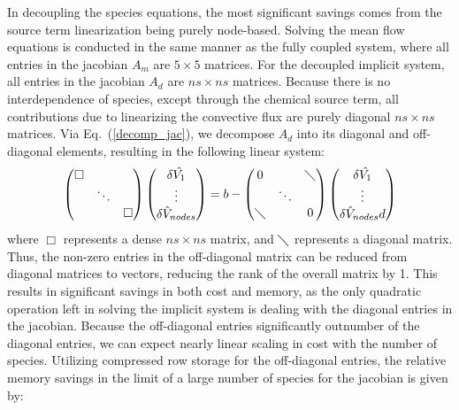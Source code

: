 \documentclass[]{aiaa-tc}%
\begin{document}
In decoupling the species equations, the most significant savings comes from the source term linearization being purely node-based\cite{gnoffo-tp}.  Solving the mean flow equations is conducted in the same manner as the fully coupled system, where all entries in the jacobian $A_m$ are $5\times5$ matrices.  For the decoupled implicit system, all entries in the jacobian $A_d$ are $ns \times ns$ matrices.  Because there is no interdependence of species, except through the chemical source term, all contributions due to linearizing the convective flux are purely diagonal $ns \times ns$ matrices.  Via Eq.~(\ref{decomp_jac}), we decompose $A_d$ into its diagonal and off-diagonal elements, resulting in the following linear system:
%
\begin{equation}
\label{dc_sys}
	\begin{pmatrix}
		\Box & & \\
		& \ddots & \\
		& & \Box
	\end{pmatrix}
	\begin{pmatrix}
		\delta \hat{V_1} \\
		\vdots \\
		\delta \hat{V}_{nodes}
	\end{pmatrix} = b -
	\begin{pmatrix}
		0 & & \diagdown \\
		& \ddots & \\
		\diagdown & & 0
	\end{pmatrix}
	\begin{pmatrix}
		\delta \hat{V_1} \\
		\vdots \\
		\delta \hat{V}_{nodes}d
	\end{pmatrix}
\end{equation}
%
where $\Box$ represents a dense $ns \times ns$ matrix, and $\diagdown$ represents a diagonal matrix.  Thus, the non-zero entries in the off-diagonal matrix can be reduced from diagonal matrices to vectors, reducing the rank of the overall matrix by 1.  This results in significant savings in both cost and memory, as the only quadratic operation left in solving the implicit system is dealing with the diagonal entries in the jacobian.  Because the off-diagonal entries significantly outnumber of the diagonal entries, we can expect nearly linear scaling in cost with the number of species.  Utilizing compressed row storage\cite{George} for the off-diagonal entries, the relative memory savings in the limit of a large number of species for the jacobian is given by:
\end{document}
